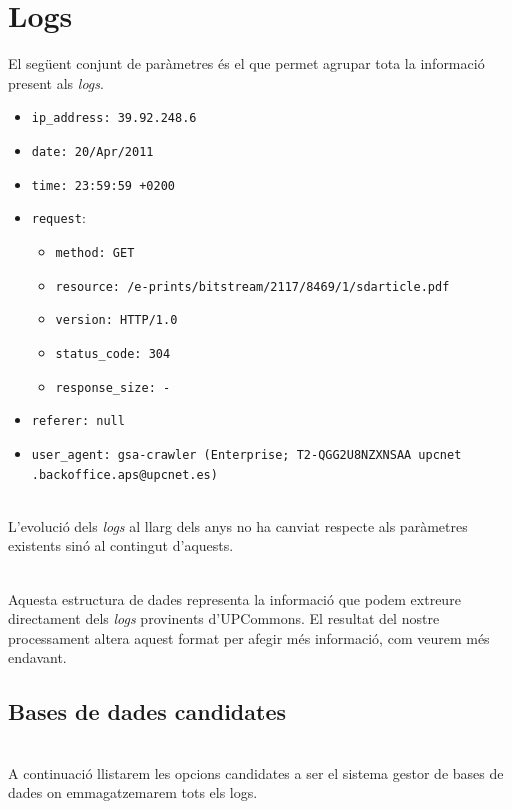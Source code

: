\section{Logs}\label{sec:logs-storing}

El següent conjunt de paràmetres és el que permet agrupar tota la informació present als \textit{\gls{log}s}.

\begin{itemize}
    \item \texttt{ip\_address: 39.92.248.6}
    \item \texttt{date: 20/Apr/2011}
    \item \texttt{time: 23:59:59 +0200}
    \item \texttt{request}:
    \begin{itemize}
        \item \texttt{method: GET}
        \item \texttt{resource: /e-prints/bitstream/2117/8469/1/sdarticle.pdf}
        \item \texttt{version: HTTP/1.0}
        \item \texttt{status\_code: 304}
        \item \texttt{response\_size: -}
    \end{itemize}
    \item \texttt{referer: null}
    \item \texttt{user\_agent:  gsa-crawler (Enterprise; T2-QGG2U8NZXNSAA upcnet\\.backoffice.aps@upcnet.es)}
\end{itemize}

\noindent \\
L’evolució dels \textit{\gls{log}s} al llarg dels anys no ha canviat respecte als paràmetres existents sinó al contingut d’aquests.

\noindent \\
Aquesta estructura de dades representa la informació que podem extreure directament dels \textit{\gls{log}s} provinents d'\gls{UPCommons}.
El resultat del nostre processament altera aquest format per afegir més informació, com veurem més endavant.

\clearpage

\subsection{Bases de dades candidates}\label{subsec:log-db-options}

\noindent \\
A continuació llistarem les opcions candidates a ser el sistema gestor de bases de dades on emmagatzemarem tots els logs.

